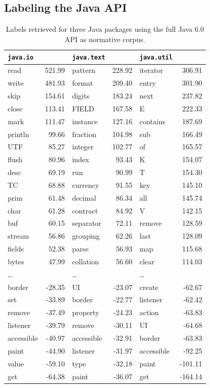 \subsection{Labeling the Java API}\label{example1}

\begin{table}
{\scriptsize \begin{center}
\begin{tabular}{lr | lr | lr}
\verb$java.io$ & ~ & \verb$java.text$ & ~ &  \verb$java.util$ & ~ \\
\hline
read & 521.99 & pattern & 228.92 & iterator & 306.91\\
write & 481.93 & format & 209.40 & entry & 301.90\\
skip & 154.61 & digits & 183.24 & next & 237.82\\
close & 113.41 & FIELD & 167.58 & E & 222.33\\
mark & 111.47 & instance & 127.16 & contains & 187.69\\
println & 99.66 & fraction & 104.98 & sub & 166.49\\
UTF & 85.27 & integer & 102.77 & of & 165.57\\
flush & 80.96 & index & 93.43 & K & 154.07\\
desc & 69.19 & run & 90.99 & T & 154.30\\
TC & 68.88 & currency & 91.55 & key & 145.10\\
prim & 61.48 & decimal & 86.34 & all & 145.74\\
char & 61.28 & contract & 84.92 & V & 142.15\\
buf & 60.15 & separator & 72.11 & remove & 128.59\\
stream & 56.86 & grouping & 62.26 & last & 128.09\\
fields & 52.38 & parse & 56.93 & map & 115.68\\
bytes & 47.99 & collation & 56.60 & clear & 114.03\\
\dots & ~ & \dots & ~ & \dots & ~ \\
border & -28.35 & UI & -23.07 & create & -62.67\\
set & -33.89 & border & -22.77 & listener & -62.42\\
remove & -37.49 & property & -24.23 & action & -63.83\\
listener & -39.79 & remove & -30.11 & UI & -64.68\\
accessible & -40.97 & accessible & -32.91 & border & -63.83\\
paint & -44.90 & listener & -31.97 & accessible & -92.25\\
value & -59.10 & type & -32.18 & paint & -101.11\\
get & -64.38 & paint & -36.07 & get & -164.14\\
\end{tabular}
\end{center}}
\caption{Labels retrieved for three Java packages using the full Java 6.0 API as normative corpus.}
\label{tab:one}
\end{table}%


